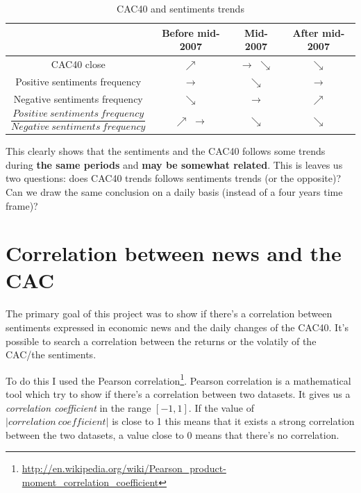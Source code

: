 \documentclass[12pt]{report}
\begin{document}
			\begin{center}
			\begin{table}
			\begin{tabular}{|c | c | c | c|}
				\hline
				& Before mid-2007 & Mid-2007 & After mid-2007\\
				\hline
				CAC40 close & $\nearrow$ & $\rightarrow$ $\searrow$ & $\searrow$\\
				\hline
				Positive sentiments frequency & $\rightarrow$ & $\searrow$ & $\rightarrow$\\
				\hline
				Negative sentiments frequency & $\searrow$ & $\rightarrow$ & $\nearrow$\\
				\hline
				$\dfrac{Positive\ sentiments\ frequency}{Negative\ sentiments\ frequency}$ & $\nearrow$ $\rightarrow$ & $\searrow$ & $\searrow$\\
				\hline
			\end{tabular}
			\caption{CAC40 and sentiments trends\label{trends}}
			\end{table}
			\end{center}
			
			This clearly shows that the sentiments and the CAC40 follows some trends during \textbf{the same periods} and \textbf{may be somewhat related}. This is leaves us two questions: does CAC40 trends follows sentiments trends (or the opposite)? Can we draw the same conclusion on a daily basis (instead of a four years time frame)?

		\section{Correlation between news and the CAC}

			The primary goal of this project was to show if there's a correlation between sentiments expressed in economic news and the daily changes of the CAC40. It's possible to search a correlation between the returns or the volatily of the CAC/the sentiments.
			
			To do this I used the Pearson correlation\footnote{\url{http://en.wikipedia.org/wiki/Pearson_product-moment_correlation_coefficient}}. Pearson correlation is a mathematical tool which try to show if there's a correlation between two datasets. It gives us a \emph{correlation coefficient} in the range $[-1, 1]$. If the value of $|correlation\ coefficient|$ is close to 1 this means that it exists a strong correlation between the two datasets, a value close to 0 means that there's no correlation.
			
\end{document}
